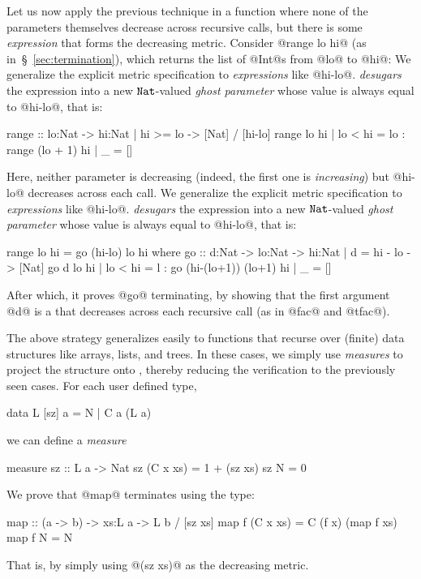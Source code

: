 Let us now apply the previous technique in a function where
none of the parameters themselves decrease across recursive calls,
but there is some \emph{expression} that forms the decreasing metric.
%
%
Consider @range lo hi@ (as in~\S~\ref{sec:termination}), which returns the list of 
@Int@s from @lo@ to @hi@:
%
We generalize the explicit metric specification to 
\emph{expressions} like @hi-lo@. \toolname \emph{desugars} the 
expression into a new $\mathtt{Nat}$-valued \emph{ghost parameter} 
whose value is always equal to @hi-lo@, that is:
\begin{code}
  range :: lo:Nat -> {hi:Nat | hi >= lo} -> [Nat] / [hi-lo]
  range lo hi 
    | lo < hi = lo : range (lo + 1) hi
    | _       = [] 
\end{code}
%
Here, neither parameter is decreasing (indeed, the first one
is \emph{increasing}) but @hi-lo@ decreases across each call. 
%
We generalize the explicit metric specification to 
\emph{expressions} like @hi-lo@. \toolname \emph{desugars} the 
expression into a new $\mathtt{Nat}$-valued \emph{ghost parameter} 
whose value is always equal to @hi-lo@, that is:
%
\begin{code}
  range lo hi = go (hi-lo) lo hi
    where 
      go :: d:Nat -> lo:Nat -> {hi:Nat | d = hi - lo} -> [Nat]
      go d lo hi
       | lo < hi = l : go (hi-(lo+1)) (lo+1) hi 
       | _       = []
\end{code}
%
After which, it proves @go@ terminating, by showing 
that the first argument @d@ is a \tnat that decreases across each 
recursive call (as in @fac@ and @tfac@).

The above strategy generalizes easily to functions that recurse
over (finite) data structures like arrays, lists, and trees.
In these cases, we simply use \emph{measures} to project the 
structure onto \tnat, thereby reducing the verification to 
the previously seen cases. For each user defined type, \eg
%
\begin{code}
  data L [sz] a = N | C a (L a)
\end{code}
%
we can define a \emph{measure}
%
\begin{code}
  measure sz  :: L a -> Nat
    sz (C x xs) = 1 + (sz xs)
    sz N        = 0
\end{code}
%
We prove that @map@ terminates using the type:
%
\begin{code}
  map :: (a -> b) -> xs:L a -> L b / [sz xs]
  map f (C x xs) = C (f x) (map f xs)
  map f N        = N
\end{code}
%
That is, by simply using @(sz xs)@  as the 
decreasing metric.


